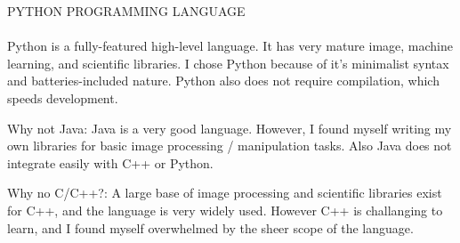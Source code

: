 PYTHON PROGRAMMING LANGUAGE\\
\\
Python is a fully-featured high-level language. It has very mature image, machine learning, and scientific libraries.  I chose Python because of it's minimalist syntax and batteries-included nature.  Python also does not require compilation, which speeds development.





Why not Java:  Java is a very good language. However, I found myself writing my own libraries for basic image processing / manipulation tasks.  Also Java does not integrate easily with C++ or Python.

Why no C/C++?:    A large base of image processing and scientific libraries exist for C++, and the language is very widely used.  However C++ is challanging to learn, and I found myself overwhelmed by the sheer scope of the language.


\newpage
